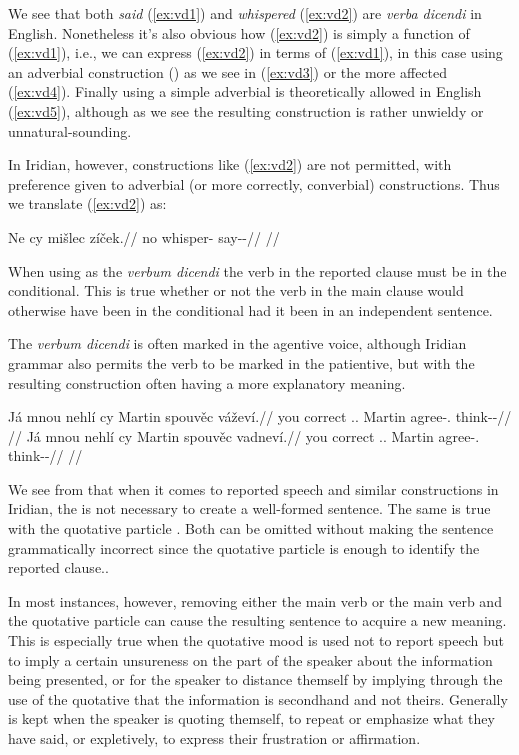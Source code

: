 We see that both \emph{said} (\ref{ex:vd1}) and \emph{whispered} (\ref{ex:vd2})
are \emph{verba dicendi} in English. Nonetheless it's also obvious how
(\ref{ex:vd2}) is simply a function of (\ref{ex:vd1}), i.e., we can express
(\ref{ex:vd2}) in terms of (\ref{ex:vd1}), in this case using an adverbial
construction () as we see in (\ref{ex:vd3}) or the more
affected (\ref{ex:vd4}). Finally using a simple adverbial is theoretically allowed
in English (\ref{ex:vd5}), although as we see the resulting construction is
rather unwieldy or unnatural-sounding.

In Iridian, however, constructions like (\ref{ex:vd2}) are not permitted, with
preference given to adverbial (or more correctly, converbial)
constructions. Thus we translate (\ref{ex:vd2}) as:

\pex
\begingl
\gla Ne cy mišlec zíček.//
\glb no  whisper-\Cv{} say-\Av{}-\Pf{}//
\glft {}//
\endgl
\xe

When using  as the \emph{verbum dicendi} the verb in the
reported clause must be in the conditional. This is true whether or not the verb
in the main clause would otherwise have been in the conditional had it been in
an independent sentence.


The \emph{verbum dicendi} is often marked in the agentive voice, although
Iridian grammar also permits the verb to be marked in the patientive, but with
the resulting construction often having a more explanatory meaning.

\pex
\a
\begingl
  \gla Já mnou nehlí cy Martin spouvěc váževí.//
  \glb you correct \Cop{}.\Sbj{}.\Quot{} \Qp{} Martin agree-\Cv{}.\Ipf{} think-\Av{}-\Cont{}//
  \glft {}//
\endgl
\a
\begingl
  \gla Já mnou nehlí cy Martin spouvěc vadneví.//
  \glb you correct \Cop{}.\Sbj{}.\Quot{} \Qp{} Martin agree-\Cv{}.\Ipf{} think-\Pv{}-\Cont{}//
  \glft {}//
\endgl
\xe

We see from  that when it comes to reported speech and similar constructions in
Iridian, the  is not necessary to
create a well-formed sentence. The same is true with the quotative particle
. Both can be omitted without making the sentence grammatically
incorrect since the quotative particle is enough to identify the reported
clause..

In most instances, however, removing either the main verb or the main verb and
the quotative particle can cause the resulting sentence to acquire a new
meaning. This is especially true when the quotative mood is used not to report
speech but to imply a certain unsureness on the part of the speaker about the
information being presented, or for the speaker to distance themself by implying
through the use of the quotative that the information is secondhand and not
theirs. Generally  is kept when the speaker is quoting themself, to
repeat or emphasize what they have said, or expletively, to express their
frustration or affirmation.

